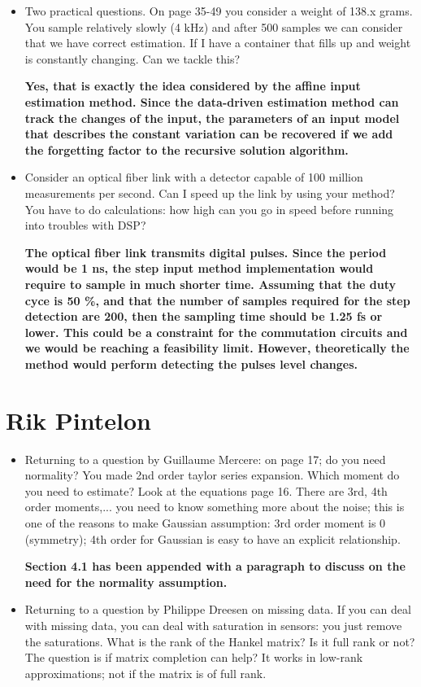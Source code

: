 \documentclass[11pt]{article}
\begin{document}
\begin{itemize}
	\item Two practical questions. On page 35-49 you consider a weight of 138.x grams. You sample relatively slowly (4 kHz) and after 500 samples we can consider that we have correct estimation. If I have a container that fills up and weight is constantly changing. Can we tackle this?
	
	{\bfseries Yes, that is exactly the idea considered by the affine input estimation method. Since the data-driven estimation method can track the changes of the input, the parameters of an input model that describes the constant variation can be recovered if we add the forgetting factor to the recursive solution algorithm. }
	
	\item  Consider an optical fiber link with a detector capable of 100 million measurements per second. Can I speed up the link by using your method? You have to do calculations: how high can you go in speed before running into troubles with DSP?
	
	{\bfseries The optical fiber link transmits digital pulses. Since the period would be 1 ns, the step input method implementation would require to sample in much shorter time. Assuming that the duty cyce is 50 \%, and that the number of samples required for the step detection are 200, then the sampling time should be 1.25 fs or lower. This could be a constraint for the commutation circuits and we would be reaching a feasibility limit. However, theoretically the method would perform detecting the pulses level changes.  }
	
\end{itemize}

\section*{Rik Pintelon}

\begin{itemize}
	\item Returning to a question by Guillaume Mercere: on page 17; do you need normality? You made 2nd order taylor series expansion. Which moment do you need to estimate? Look at the equations page 16. There are 3rd, 4th order moments,... you need to know something more about the noise; this is one of the reasons to make Gaussian assumption: 3rd order moment is 0 (symmetry); 4th order for Gaussian is easy to have an explicit relationship.
	
    {\bfseries Section 4.1 has been appended with a paragraph to discuss on the need for the normality assumption.  }

	\item  Returning to a question by Philippe Dreesen on missing data. If you can deal with missing data, you can deal with saturation in sensors: you just remove the saturations. What is the rank of the Hankel matrix? Is it full rank or not? The question is if matrix completion can help? It works in low-rank approximations; not if the matrix is of full rank.
\end{itemize}
\end{document}
